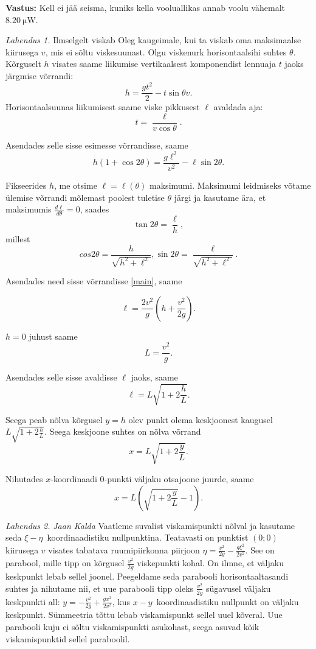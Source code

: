 \documentclass[10pt]{article}
\begin{document}
\textbf{Vastus:}
Kell ei jää seisma, kuniks kella vooluallikas annab voolu vähemalt
$\SI {8.20}{\micro\watt}$.
\probend
\bigskip

\setAuthor{}

\solu
\emph{Lahendus 1.}
Ilmselgelt viskab Oleg kaugeimale, kui ta viskab oma maksimaalse kiirusega $v$, mis ei sõltu viskesuunast. Olgu viskenurk horisontaalsihi suhtes $\theta$. Kõrguselt $h$ visates saame liikumise vertikaalsest komponendist lennuaja $t$ jaoks järgmise võrrandi:
\[h=\frac{gt^2}{2}-t\sin \theta v.\]
Horisontaalsuunas liikumisest saame viske pikkusest $\ell$ avaldada aja:
\[t=\frac{\ell}{v\cos \theta}.\]

Asendades selle sisse esimesse võrrandisse, saame
\begin{equation}\label{main}
    h(1+\cos 2\theta)=\frac{g\ell^2}{v^2}-\ell\sin 2\theta.
\end{equation}

Fikseerides $h$, me otsime $\ell=\ell(\theta)$ maksimumi. Maksimumi leidmiseks võtame ülemise võrrandi mõlemast poolest tuletise $\theta$ järgi ja kasutame ära, et maksimumis $\frac{d\ell}{d\theta}=0$, saades
\[\tan 2\theta=\frac{\ell}{h},\]
millest
\[cos2\theta=\frac{h}{\sqrt{h^2+\ell^2}}, \sin 2\theta=\frac{\ell}{\sqrt{h^2+\ell^2}}.\]

Asendades need sisse võrrandisse \ref{main}, saame

\[\ell=\frac{2v^2}{g}\left(h+\frac{v^2}{2g}\right).\]

$h=0$ juhust saame
\[L=\frac{v^2}{g}.\]

Asendades selle sisse avaldisse $\ell$ jaoks, saame
\[\ell=L\sqrt{1+2\frac{h}{L}}.\]

Seega peab nõlva kõrgusel $y=h$ olev punkt olema keskjoonest kaugusel $L\sqrt{1+2\frac{h}{L}}$. Seega keskjoone suhtes on nõlva võrrand
\[x=L\sqrt{1+2\frac{y}{L}}.\]

Nihutades $x$-koordinaadi $0$-punkti väljaku otsajoone juurde, saame
\[x=L\left(\sqrt{1+2\frac{y}{L}}-1\right).\]

\emph{Lahendus 2.}
\emph{Jaan Kalda}
Vaatleme suvalist viskamispunkti nõlval ja kasutame seda $\xi-\eta$~koordinaadistiku nullpunktina. Teatavasti on punktist $(0;0)$ kiirusega $v$ visates tabatava ruumipiirkonna piirjoon $\eta=\frac{v^2}{2g}-\frac{g\xi^2}{2v^2}$. See on parabool, mille tipp on kõrgusel $\frac{v^2}{2g}$ viskepunkti kohal. On ilmne, et väljaku keskpunkt lebab sellel joonel. Peegeldame seda parabooli horisontaaltasandi suhtes ja nihutame nii, et uue parabooli tipp oleks $\frac{v^2}{2g}$ sügavusel väljaku keskpunkti all: $y=-\frac{v^2}{2g}+\frac{gx^2}{2v^2}$, kus  $x-y$~koordinaadistiku nullpunkt on väljaku keskpunkt. Sümmeetria tõttu lebab viskamispunkt sellel uuel kõveral. Uue parabooli kuju ei sõltu viskamispunkti asukohast, seega asuvad kõik viskamispunktid sellel paraboolil.
\end{document}
